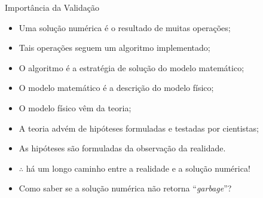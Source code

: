     \begin{frame}{Importância da Validação}\vspace*{-2em}
        \begin{itemize}
            \item<1-> Uma \alert{solução numérica} é o resultado de \alert{muitas operações};
            \item<2-> Tais operações seguem um \alert{algoritmo implementado};
            \item<3-> O algoritmo é a estratégia de solução do \alert{modelo matemático};
            \item<4-> O modelo matemático é a descrição do \alert{modelo físico};
            \item<5-> O modelo físico vêm da \alert{teoria};
            \item<6-> A teoria advém de \alert{hipóteses} formuladas e testadas por cientistas;
            \item<7-> As hipóteses são formuladas da \alert{observação} da \alert{realidade}.
            \item<8-> $\therefore$ há um \alert{longo caminho} entre a \alert{realidade} e a
                \alert{solução numérica}!
            \item<9-> Como saber se a solução numérica não retorna ``\textit{garbage\/}''?
        \end{itemize}
    \end{frame}

